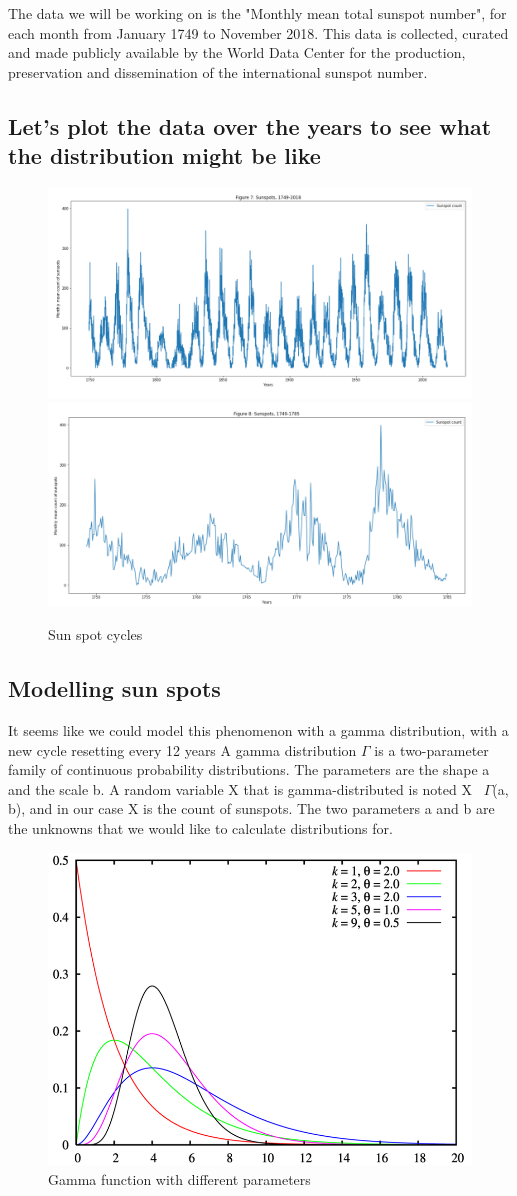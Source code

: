 The data we will be working on is the "Monthly mean total sunspot number", for each month from January 1749 to November 2018. This data is collected, curated and made publicly available by the World Data Center for the production, preservation and dissemination of the international sunspot number.

\subsection{Let's plot the data over the years to see what the distribution might be like}

\begin{figure}[h]
    \centering
\includegraphics[width=.48\textwidth]{pic/p05c09-snip07}
\includegraphics[width=.48\textwidth]{pic/p05c09-snip08}
    \caption{Sun spot cycles}
    \label{fig:p05c09-snip07}
\end{figure}

\FloatBarrier

\subsection{Modelling sun spots}
It seems like we could model this phenomenon with a gamma distribution, with a new cycle resetting every 12 years
A gamma distribution  $\Gamma$ is a two-parameter family of continuous probability distributions. The parameters are the shape a and the scale b. A random variable X that is gamma-distributed is noted X~ $\Gamma$(a, b), and in our case X is the count of sunspots. The two parameters a and b are the unknowns that we would like to calculate distributions for.

\begin{figure}[h]
    \centering
\includegraphics[width=.6\textwidth]{pic/p05c09-snip09}
    \caption{Gamma function with different parameters}
    \label{fig:p05c09-snip09}
\end{figure}

